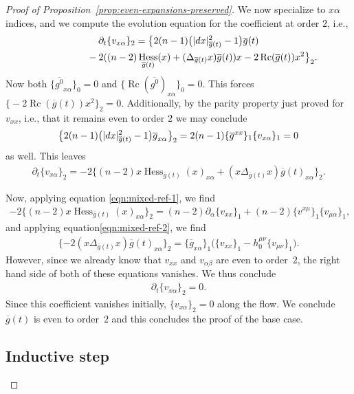 \documentclass[11pt]{article}
\numberwithin{equation}{section}
\newcommand{\del}{\partial}
\newcommand{\olg}{\overline{g}}
\newcommand{\olgin}{\overline{\gin}}
\newcommand{\gin}{{g^0}}
\newcommand{\gbar}{\overline{g}}
\DeclareMathOperator{\Rc}{Rc}
\DeclareMathOperator{\hess}{Hess}
\begin{document}
\begin{proof}[Proof of Proposition~\ref{prop:even-expansions-preserved}]
We now specialize to $x\alpha$ indices, and we compute the evolution equation for the coefficient at order $2$, i.e.,
\begin{gather*}
\del_t \{ v_{x\alpha} \}_{2}
 =\big\{ 2 (n-1) \big(|{\rm d}x|^2_{\gbar(t)} -1\big) \olg(t) \\
 \hphantom{\del_t \{ v_{x\alpha} \}_{2}=}{} -2 ( (n-2) \hess_{\olg(t)} (x) + (\Delta_{\olg(t)} x) \olg(t) ) x -2 \Rc(\gbar(t)) x^2 \big\}_2.
\end{gather*}
Now both $\big\{ \olgin_{x\alpha} \big\}_0 = 0$ and $\big\{\Rc(\olgin)_{x\alpha} \big\}_0 = 0$. This forces $\big\{ {-}2 \Rc(\gbar(t)) x^2 \big\}_2 = 0$. Additionally, by the parity property just proved for~$v_{xx}$, i.e., that it remains even to order $2$ we may conclude
\begin{gather*}
\big\{2 (n-1) \big(|{\rm d}x|^2_{\gbar(t)} -1\big) \olg_{x\alpha} \big\}_{2} = 2(n-1)\{\olg^{xx}\}_1 \{ v_{x\alpha}\}_1 = 0
\end{gather*}
as well. This leaves
\begin{gather*}
\del_t \{ v_{x\alpha} \}_{2} = -2 \{ (n-2) x\hess_{\olg(t)} (x)_{x\alpha} + (x \Delta_{\olg(t)} x) \olg(t)_{x\alpha} \}_2.
\end{gather*}

Now, applying equation \eqref{eqn:mixed-ref-1}, we find
\begin{gather*}
-2 \{ (n-2) x\hess_{\olg(t)} (x)_{x\alpha} \}_{2} = (n-2)\partial_{\alpha} \{v_{xx}\}_1 + (n-2)\{ v^{x \mu} \}_1 \{ v_{\mu \alpha}\}_1,
\end{gather*}
and applying equation\eqref{eqn:mixed-ref-2}, we find
\begin{gather*}
\{ -2 (x\Delta_{\olg(t)} x) \olg(t)_{x\alpha} \}_2 = \{\gbar_{x \alpha}\}_1 \big( \{v_{xx}\}_1 - h_0^{\mu \nu} \{v_{\mu\nu}\}_1\big).
\end{gather*}
However, since we already know that $v_{xx}$ and $v_{\alpha \beta}$ are even to order~$2$, the right hand side of both of these equations vanishes. We thus conclude
\begin{gather*}
\del_t \{ v_{x\alpha} \}_{2} = 0.
\end{gather*}
Since this coefficient vanishes initially, $\{v_{x\alpha}\}_2 = 0$ along the flow. We conclude $\olg(t)$ is even to order~$2$ and this concludes the proof of the base case.

\subsection*{Inductive step}


\end{proof}
\end{document}
